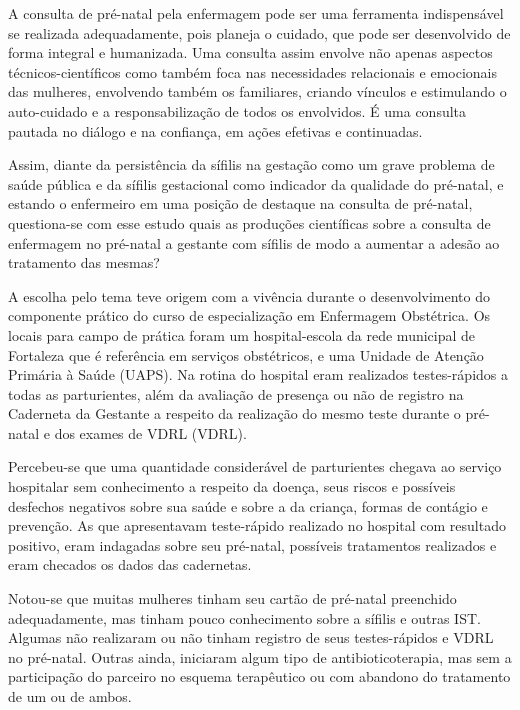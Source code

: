 A consulta de pré-natal pela enfermagem pode ser uma ferramenta indispensável se realizada adequadamente, pois planeja o cuidado, que pode ser desenvolvido de forma integral e humanizada. Uma consulta assim envolve não apenas aspectos técnicos-científicos como também foca nas necessidades relacionais e emocionais das mulheres, envolvendo também os familiares, criando vínculos e estimulando o auto-cuidado e a responsabilização de todos os envolvidos. É uma consulta pautada no diálogo e na confiança, em ações efetivas e continuadas. \cite{rodrigues2016elementos}

Assim, diante da persistência da sífilis na gestação como um grave problema de saúde pública e da sífilis gestacional como indicador da qualidade do pré-natal, e estando o enfermeiro em uma posição de destaque na consulta de pré-natal, questiona-se com esse estudo quais as produções científicas sobre a consulta de enfermagem no pré-natal a gestante com sífilis de modo a aumentar a adesão ao tratamento das mesmas?

A escolha pelo tema teve origem com a vivência durante o desenvolvimento do componente prático do curso de especialização em Enfermagem Obstétrica. Os locais para campo de prática foram um hospital-escola da rede municipal de Fortaleza que é referência em serviços obstétricos, e uma Unidade de Atenção Primária à Saúde (\acrshort{UAPS}). Na rotina do hospital eram realizados testes-rápidos a todas as parturientes, além da avaliação de presença ou não de registro na Caderneta da Gestante a respeito da realização do mesmo teste durante o pré-natal e dos exames de VDRL (\acrlong{VDRL}).

Percebeu-se que uma quantidade considerável de parturientes chegava ao serviço hospitalar sem conhecimento a respeito da doença, seus riscos e possíveis desfechos negativos sobre sua saúde e sobre a da criança, formas de contágio e prevenção. As que apresentavam teste-rápido realizado no hospital com resultado positivo, eram indagadas sobre seu pré-natal, possíveis tratamentos realizados e eram checados os dados das cadernetas. 

Notou-se que muitas mulheres tinham seu cartão de pré-natal preenchido adequadamente, mas tinham pouco conhecimento sobre a sífilis e outras \acrshort{IST}. Algumas não realizaram ou não tinham registro de seus testes-rápidos e VDRL no pré-natal. Outras ainda, iniciaram algum tipo de antibioticoterapia, mas sem a participação do parceiro no esquema terapêutico ou com abandono do tratamento de um ou de ambos.

